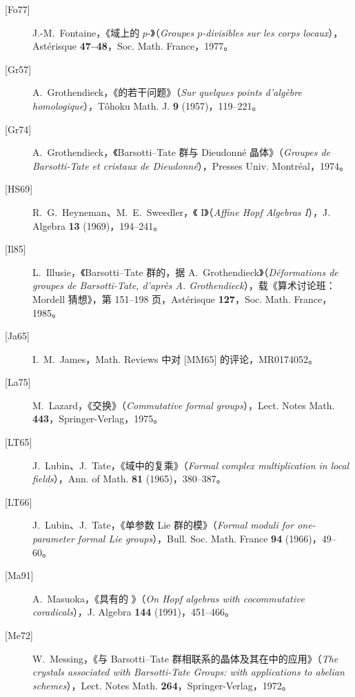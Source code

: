 \begin{description}
\item[{[Fo77]}] J.-M.~Fontaine，《域上的 $p$-》（\textit{Groupes $p$-divisibles sur les corps locaux}），Astérisque \textbf{47--48}，Soc. Math. France，1977。
\item[{[Gr57]}] A.~Grothendieck，《的若干问题》（\textit{Sur quelques points d'algèbre homologique}），Tôhoku Math. J. \textbf{9} (1957)，119--221。
\item[{[Gr74]}] A.~Grothendieck，《Barsotti--Tate 群与 Dieudonn\'e 晶体》（\textit{Groupes de Barsotti-Tate et cristaux de Dieudonné}），Presses Univ. Montréal，1974。
\item[{[HS69]}] R.~G.~Heyneman、M.~E.~Sweedler，《  I》（\textit{Affine Hopf Algebras I}），J. Algebra \textbf{13} (1969)，194--241。
\item[{[Il85]}] L.~Illusie，《Barsotti--Tate 群的，据 A.~Grothendieck》（\textit{Déformations de groupes de Barsotti-Tate, d'après A. Grothendieck}），载《算术讨论班：Mordell 猜想》，第 151--198 页，Astérisque \textbf{127}，Soc. Math. France，1985。
\item[{[Ja65]}] I.~M.~James，Math. Reviews 中对 [MM65] 的评论，MR0174052。
\item[{[La75]}] M.~Lazard，《交换》（\textit{Commutative formal groups}），Lect. Notes Math. \textbf{443}，Springer-Verlag，1975。
\item[{[LT65]}] J.~Lubin、J.~Tate，《域中的复乘》（\textit{Formal complex multiplication in local fields}），Ann. of Math. \textbf{81} (1965)，380--387。
\item[{[LT66]}] J.~Lubin、J.~Tate，《单参数 Lie 群的模》（\textit{Formal moduli for one-parameter formal Lie groups}），Bull. Soc. Math. France \textbf{94} (1966)，49--60。
\item[{[Ma91]}] A.~Masuoka，《具有的 》（\textit{On Hopf algebras with cocommutative coradicals}），J. Algebra \textbf{144} (1991)，451--466。
\item[{[Me72]}] W.~Messing，《与 Barsotti--Tate 群相联系的晶体及其在中的应用》（\textit{The crystals associated with Barsotti-Tate Groups: with applications to abelian schemes}），Lect. Notes Math. \textbf{264}，Springer-Verlag，1972。

\end{description}
